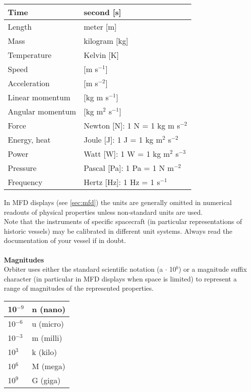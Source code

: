 \documentclass[Orbiter User Manual.tex]{subfiles}
\begin{document}
	\begin{longtable}{ |p{}|p{}| }
	\hline\rule{0pt}{2ex}
	Time & second [s]\\
	\hline\rule{0pt}{2ex}
	Length & meter [m]\\
	\hline\rule{0pt}{2ex}
	Mass & kilogram [kg]\\
	\hline\rule{0pt}{2ex}
	Temperature & Kelvin [K]\\
	\hline\rule{0pt}{2ex}
	Speed & [m s$^{-1}$]\\
	\hline\rule{0pt}{2ex}
	Acceleration & [m s$^{-2}$]\\
	\hline\rule{0pt}{2ex}
	Linear momentum & [kg m s$^{-1}$]\\
	\hline\rule{0pt}{2ex}
	Angular momentum & [kg m$^{2}$ s$^{-1}$]\\
	\hline\rule{0pt}{2ex}
	Force & Newton [N]: 1 N = 1 kg m s$^{-2}$\\
	\hline\rule{0pt}{2ex}
	Energy, heat & Joule [J]: 1 J = 1 kg m$^{2}$ s$^{-2}$\\
	\hline\rule{0pt}{2ex}
	Power & Watt [W]: 1 W = 1 kg m$^{2}$ s$^{-3}$\\
	\hline\rule{0pt}{2ex}
	Pressure & Pascal [Pa]: 1 Pa = 1 N m$^{-2}$\\
	\hline\rule{0pt}{2ex}
	Frequency & Hertz [Hz]: 1 Hz = 1 s$^{-1}$\\
	\hline
	\end{longtable}

\noindent
In MFD displays (see \ref{sec:mfd}) the units are generally omitted in numerical readouts of physical properties unless non-standard units are used.\\
Note that the instruments of specific spacecraft (in particular representations of historic vessels) may be calibrated in different unit systems. Always read the documentation of your vessel if in doubt.\\
\\
\textbf{Magnitudes}\\
Orbiter uses either the standard scientific notation (a $\cdot$ 10$^{b}$) or a magnitude suffix character (in particular in MFD displays when space is limited) to represent a range of magnitudes of the represented properties.

	\begin{longtable}{ |p{}|p{}| }
	\hline\rule{0pt}{2ex}
	10$^{-9}$ & n (nano)\\
	\hline\rule{0pt}{2ex}
	10$^{-6}$ & u (micro)\\
	\hline\rule{0pt}{2ex}
	10$^{-3}$ & m (milli)\\
	\hline\rule{0pt}{2ex}
	10$^{3}$ & k (kilo)\\
	\hline\rule{0pt}{2ex}
	10$^{6}$ & M (mega)\\
	\hline\rule{0pt}{2ex}
	10$^{9}$ & G (giga)\\
	\hline
	\end{longtable}
\end{document}
